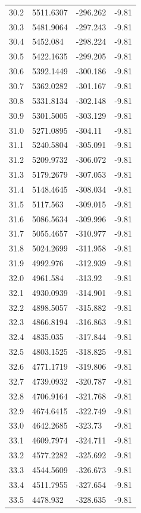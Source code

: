 \begin{table}[H]
\begin{tabular}{llll}
30.2 & 5511.6307 & -296.262 & -9.81 \\
30.3 & 5481.9064 & -297.243 & -9.81 \\
30.4 & 5452.084 & -298.224 & -9.81 \\
30.5 & 5422.1635 & -299.205 & -9.81 \\
30.6 & 5392.1449 & -300.186 & -9.81 \\
30.7 & 5362.0282 & -301.167 & -9.81 \\
30.8 & 5331.8134 & -302.148 & -9.81 \\
30.9 & 5301.5005 & -303.129 & -9.81 \\
31.0 & 5271.0895 & -304.11 & -9.81 \\
31.1 & 5240.5804 & -305.091 & -9.81 \\
31.2 & 5209.9732 & -306.072 & -9.81 \\
31.3 & 5179.2679 & -307.053 & -9.81 \\
31.4 & 5148.4645 & -308.034 & -9.81 \\
31.5 & 5117.563 & -309.015 & -9.81 \\
31.6 & 5086.5634 & -309.996 & -9.81 \\
31.7 & 5055.4657 & -310.977 & -9.81 \\
31.8 & 5024.2699 & -311.958 & -9.81 \\
31.9 & 4992.976 & -312.939 & -9.81 \\
32.0 & 4961.584 & -313.92 & -9.81 \\
32.1 & 4930.0939 & -314.901 & -9.81 \\
32.2 & 4898.5057 & -315.882 & -9.81 \\
32.3 & 4866.8194 & -316.863 & -9.81 \\
32.4 & 4835.035 & -317.844 & -9.81 \\
32.5 & 4803.1525 & -318.825 & -9.81 \\
32.6 & 4771.1719 & -319.806 & -9.81 \\
32.7 & 4739.0932 & -320.787 & -9.81 \\
32.8 & 4706.9164 & -321.768 & -9.81 \\
32.9 & 4674.6415 & -322.749 & -9.81 \\
33.0 & 4642.2685 & -323.73 & -9.81 \\
33.1 & 4609.7974 & -324.711 & -9.81 \\
33.2 & 4577.2282 & -325.692 & -9.81 \\
33.3 & 4544.5609 & -326.673 & -9.81 \\
33.4 & 4511.7955 & -327.654 & -9.81 \\
33.5 & 4478.932 & -328.635 & -9.81 \\

\end{tabular}
\end{table}

